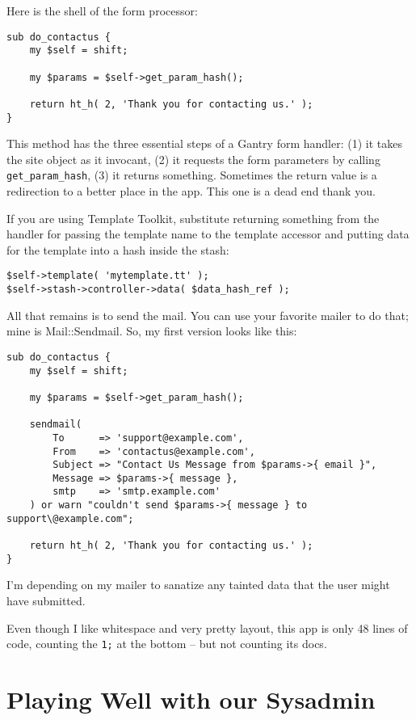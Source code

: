Here is the shell of the form processor:

\begin{verbatim}
sub do_contactus {
    my $self = shift;

    my $params = $self->get_param_hash();

    return ht_h( 2, 'Thank you for contacting us.' );
}
\end{verbatim}

This method has the three essential steps of a Gantry form handler: (1)
it takes the site object as it invocant, (2) it requests the form
parameters by calling \verb+get_param_hash+, (3) it returns something.
Sometimes the return value is a redirection to a better place in the
app.  This one is a dead end thank you.

If you are using Template Toolkit, substitute returning something from
the handler for passing the template name to the template accessor and
putting data for the template into a hash inside the stash:

\begin{verbatim}
$self->template( 'mytemplate.tt' );
$self->stash->controller->data( $data_hash_ref );
\end{verbatim}

All that remains is to send the mail.  You can use your favorite mailer
to do that; mine is Mail::Sendmail.  So, my first version looks like this:

\begin{verbatim}
sub do_contactus {
    my $self = shift;

    my $params = $self->get_param_hash();

    sendmail(
        To      => 'support@example.com',
        From    => 'contactus@example.com',
        Subject => "Contact Us Message from $params->{ email }",
        Message => $params->{ message },
        smtp    => 'smtp.example.com'
    ) or warn "couldn't send $params->{ message } to support\@example.com";

    return ht_h( 2, 'Thank you for contacting us.' );
}
\end{verbatim}

I'm depending on my mailer to sanatize any tainted data that the user
might have submitted.

Even though I like whitespace and very pretty layout, this app is only
48 lines of code, counting the \verb+1;+ at the bottom -- but not counting
its docs.

\section{Playing Well with our Sysadmin}


